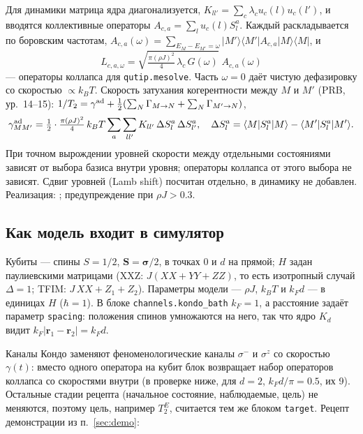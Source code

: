 \documentclass[12pt,a4paper]{article}
\newcommand{\rhoJ}{\rho J}
\newcommand{\kT}{k_BT}
\begin{document}
Для динамики матрица ядра диагонализуется, $K_{ll'}=\sum_c\lambda_c u_c(l)u_c(l')$, и вводятся
коллективные операторы $A_{c,a}=\sum_l u_c(l)S^a_l$. Каждый раскладывается по боровским частотам,
$A_{c,a}(\omega)=\sum_{E_M-E_{M'}=\omega}|M'\rangle\langle M'|A_{c,a}|M\rangle\langle M|$, и
\begin{equation}
L_{c,a,\omega}=\sqrt{\tfrac{\pi(\rhoJ)^2}{4}\,\lambda_c\,G(\omega)}\;A_{c,a}(\omega)
\end{equation}
--- операторы коллапса для \texttt{qutip.mesolve}. Часть $\omega=0$ даёт чистую дефазировку со скоростью
$\propto\kT$. Скорость затухания когерентности между $M$ и $M'$ (PRB, ур.~14--15):
$1/T_2=\gamma^{\rm ad}+\tfrac12(\sum_N\Gamma_{M\to N}+\sum_N\Gamma_{M'\to N})$,
\begin{equation}
\gamma^{\rm ad}_{MM'}=\tfrac12\cdot\tfrac{\pi(\rhoJ)^2}{4}\,\kT\sum_a\sum_{ll'}K_{ll'}\,
\Delta S^a_l\,\Delta S^a_{l'},\quad \Delta S^a_l=\langle M|S^a_l|M\rangle-\langle M'|S^a_l|M'\rangle .
\end{equation}
При точном вырождении уровней скорости между отдельными состояниями зависят от выбора базиса внутри уровня;
операторы коллапса от этого выбора не зависят. Сдвиг уровней (Lamb shift) посчитан отдельно, в динамику не добавлен.
Реализация: ; предупреждение при $\rhoJ>0.3$.

\subsection{Как модель входит в симулятор}\label{sec:model}

Кубиты --- спины $S=1/2$, $\mathbf S=\boldsymbol\sigma/2$, в точках $0$ и $d$ на прямой; $H$ задан
паулиевскими матрицами (XXZ: $J(XX+YY+ZZ)$, то есть изотропный случай $\Delta=1$; TFIM: $J\,XX+Z_1+Z_2$). Параметры модели --- $\rhoJ$, $\kT$ и
$k_Fd$ --- в единицах $H$ ($\hbar=1$). В блоке \texttt{channels.kondo\_bath} $k_F=1$, а расстояние
задаёт параметр \texttt{spacing}: положения спинов умножаются на него, так что ядро $K_d$ видит
$k_F|\mathbf r_1-\mathbf r_2|=k_Fd$.

Каналы Кондо заменяют феноменологические каналы $\sigma^-$ и $\sigma^z$ со скоростью $\gamma(t)$:
вместо одного оператора на кубит блок возвращает набор операторов коллапса со скоростями внутри
(в проверке ниже, для $d=2$, $k_Fd/\pi=0.5$, их 9). Остальные стадии рецепта (начальное состояние,
наблюдаемые, цель) не меняются, поэтому цель, например $T_2^E$, считается тем же блоком
\texttt{target}. Рецепт демонстрации из п.~\ref{sec:demo}:
\end{document}
